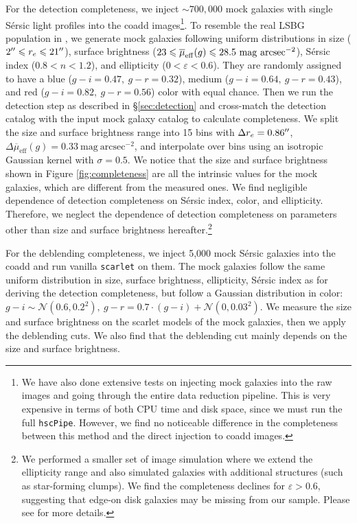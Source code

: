 \documentclass[twocolumn,astrosymb,twocolappendix]{aastex631}
\newcommand{\sbunit}{\mathrm{mag\ arcsec}^{-2}}
\newcommand{\sbeff}{\overline{\mu}_{\mathrm{eff}}(g)}
\newcommand{\code}[1]{\texttt{#1}}
\newcommand{\sersic}{S\'ersic}
\begin{document}
\begin{CJK*}{UTF8}{gbsn}
For the detection completeness, we inject $\sim 700,000$ mock galaxies with single \sersic{} light profiles into the coadd images\footnote{We have also done extensive tests on injecting mock galaxies into the raw images and going through the entire data reduction pipeline. This is very expensive in terms of both CPU time and disk space, since we must run the full \code{hscPipe}. However, we find no noticeable difference in the completeness between this method and the direct injection to coadd images.}. To resemble the real LSBG population in , we generate mock galaxies following uniform distributions in size ($2\mbox{$^{\prime\prime}$} \leqslant r_{e} \leqslant 21\mbox{$^{\prime\prime}$}$), surface brightness ($23 \leqslant \overline{\mu}_{\rm eff}(g) \leqslant 28.5\ \mathrm{mag\ arcsec^{-2}}$), \sersic{} index ($0.8 < n < 1.2$), and ellipticity ($0 < \varepsilon < 0.6$). They are randomly assigned to have a blue ($g-i=0.47,\ g-r=0.32$), medium ($g-i=0.64,\ g-r=0.43$), and red ($g-i=0.82,\ g-r=0.56$) color with equal chance. Then we run the detection step as described in \S \ref{sec:detection} and cross-match the detection catalog with the input mock galaxy catalog to calculate completeness. We split the size and surface brightness range into 15 bins with $\Delta r_e = 0.86\mbox{$^{\prime\prime}$}$, $\Delta \sbeff = 0.33\ \sbunit$, and interpolate over bins using an isotropic Gaussian kernel with $\sigma = 0.5$. We notice that the size and surface brightness shown in Figure \ref{fig:completeness} are all the intrinsic values for the mock galaxies, which are different from the measured ones. We find negligible dependence of detection completeness on \sersic{} index, color, and ellipticity. Therefore, we neglect the dependence of detection completeness on parameters other than size and surface brightness hereafter.\footnote{We performed a smaller set of image simulation where we extend the ellipticity range and also simulated galaxies with additional structures (such as star-forming clumps). We find the completeness declines for $\varepsilon > 0.6$, suggesting that edge-on disk galaxies may be missing from our sample. Please see \citet{Greene2022} for more details.}

For the deblending completeness, we inject 5,000 mock \sersic{} galaxies into the coadd and run vanilla \code{scarlet} on them. The mock galaxies follow the same uniform distribution in size, surface brightness, ellipticity, \sersic{} index as for deriving the detection completeness, but follow a Gaussian distribution in color: $g-i \sim \mathcal{N}(0.6, 0.2^2),\ g-r = 0.7 \cdot (g-i) + \mathcal{N}(0, 0.03^2)$. We measure the size and surface brightness on the scarlet models of the mock galaxies, then we apply the deblending cuts. We also find that the deblending cut mainly depends on the size and surface brightness. 


\end{CJK*}
\end{document}
